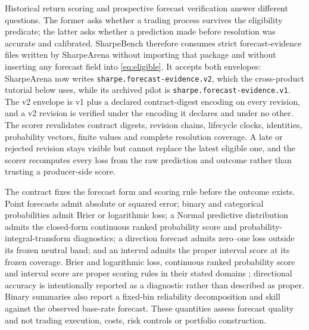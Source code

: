 Historical return scoring and prospective forecast verification answer different questions. The former asks whether a trading process survives the eligibility predicate; the latter asks whether a prediction made before resolution was accurate and calibrated. SharpeBench therefore consumes strict forecast-evidence files written by SharpeArena \citep{toca2026sharpearena} without importing that package and without inserting any forecast field into \cref{eq:eligible}. It accepts both envelopes: SharpeArena now writes \texttt{sharpe.forecast-evidence.v2}, which the cross-product tutorial below uses, while its archived pilot is \texttt{sharpe.forecast-evidence.v1}. The v2 envelope is v1 plus a declared contract-digest encoding on every revision, and a v2 revision is verified under the encoding it declares and under no other. The scorer revalidates contract digests, revision chains, lifecycle clocks, identities, probability vectors, finite values and complete resolution coverage. A late or rejected revision stays visible but cannot replace the latest eligible one, and the scorer recomputes every loss from the raw prediction and outcome rather than trusting a producer-side score.

The contract fixes the forecast form and scoring rule before the outcome exists. Point forecasts admit absolute or squared error; binary and categorical probabilities admit Brier or logarithmic loss; a Normal predictive distribution admits the closed-form continuous ranked probability score and probability-integral-transform diagnostics; a direction forecast admits zero--one loss outside its frozen neutral band; and an interval admits the proper interval score at its frozen coverage. Brier and logarithmic loss, continuous ranked probability score and interval score are proper scoring rules in their stated domains \citep{gneiting2007proper}; directional accuracy is intentionally reported as a diagnostic rather than described as proper. Binary summaries also report a fixed-bin reliability decomposition and skill against the observed base-rate forecast. These quantities assess forecast quality and not trading execution, costs, risk controls or portfolio construction.

